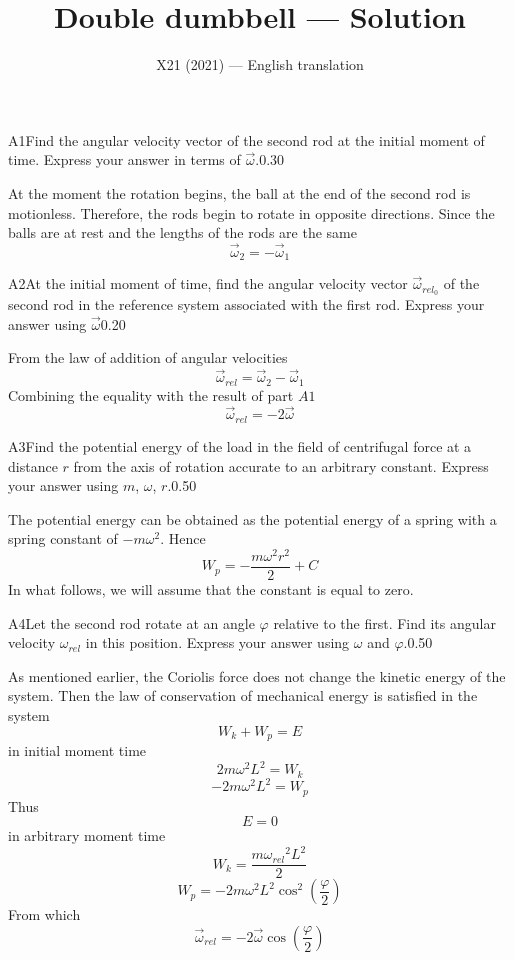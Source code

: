 \documentclass[11pt,a4paper]{article}
\title{\textbf{Double dumbbell --- Solution}}
\author{\normalsize X21 (2021) — English translation}
\date{}
\begin{document}
\maketitle\vspace{-0.5em}
\begin{solcard}{A1}{Find the angular velocity vector of the second rod at the initial moment of time. Express your answer in terms of $\vec\omega$.}{0.30}

At the moment the rotation begins, the ball at the end of the second rod is motionless. Therefore, the rods begin to rotate in opposite directions. Since the balls are at rest and the lengths of the rods are the same $$\vec{\omega}_2=-\vec{\omega}_1 $$

\end{solcard}

\begin{solcard}{A2}{At the initial moment of time, find the angular velocity vector $\vec\omega_{rel_0}$ of the second rod in the reference system associated with the first rod. Express your answer using $\vec\omega$}{0.20}

From the law of addition of angular velocities $$\vec{\omega}_{rel}=\vec{\omega}_2-\vec{\omega}_1 $$ Combining the equality with the result of part $A1$ $$\vec{\omega}_{rel}=-2\vec{\omega} $$

\end{solcard}

\begin{solcard}{A3}{Find the potential energy of the load in the field of centrifugal force at a distance $r$ from the axis of rotation accurate to an arbitrary constant. Express your answer using $m$, $\omega$, $r$.}{0.50}

The potential energy can be obtained as the potential energy of a spring with a spring constant of $-m{\omega}^2$. Hence $$W_p=-\frac{m{\omega}^2r^2}{2}+C $$ In what follows, we will assume that the constant is equal to zero.

\end{solcard}

\begin{solcard}{A4}{Let the second rod rotate at an angle $\varphi$ relative to the first. Find its angular velocity $\omega_{rel}$ in this position. Express your answer using $\omega$ and $\varphi$.}{0.50}

As mentioned earlier, the Coriolis force does not change the kinetic energy of the system. Then the law of conservation of mechanical energy is satisfied in the system $$W_k+W_p=E $$ in initial moment time $$2m{\omega}^2L^2=W_k $$ $$-2m{\omega}^2L^2=W_p $$ Thus $$E=0 $$ in arbitrary moment time $$W_k=\frac{m{\omega_{rel}}^2L^2}{2} $$ $$W_p=-2m{\omega}^2L^2\cos^2\left(\frac{\varphi}{2}\right) $$ From which $$\vec{\omega}_{rel}=-2\vec{\omega}\cos\left(\frac{\varphi}{2}\right) $$

\end{solcard}
\end{document}
